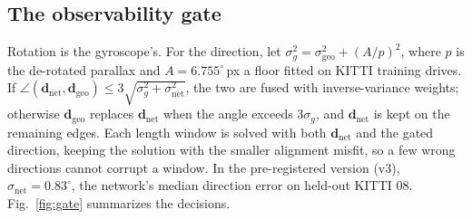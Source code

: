 \documentclass[letterpaper,journal]{IEEEtran}
\newcommand{\dnet}{\mathbf{d}_{\mathrm{net}}}
\newcommand{\dgeo}{\mathbf{d}_{\mathrm{geo}}}
\begin{document}
\subsection{The observability gate}
Rotation is the gyroscope's. For the direction, let $\sigma_g^2=\sigma_{\mathrm{geo}}^2+(A/p)^2$, where $p$ is the de-rotated parallax and $A=6.755^\circ$\,px a floor fitted on KITTI training drives. If $\angle(\dnet,\dgeo)\le 3\sqrt{\sigma_g^2+\sigma_{\mathrm{net}}^2}$, the two are fused with inverse-variance weights; otherwise $\dgeo$ replaces $\dnet$ when the angle exceeds $3\sigma_g$, and $\dnet$ is kept on the remaining edges. Each length window is solved with both $\dnet$ and the gated direction, keeping the solution with the smaller alignment misfit, so a few wrong directions cannot corrupt a window. In the pre-registered version (v3), $\sigma_{\mathrm{net}}=0.83^\circ$, the network's median direction error on held-out KITTI 08. Fig.~\ref{fig:gate} summarizes the decisions.
\end{document}
